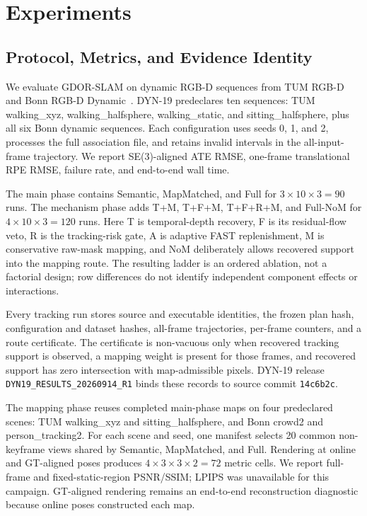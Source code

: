 \section{Experiments}
\label{sec:experiments}

\subsection{Protocol, Metrics, and Evidence Identity}

We evaluate GDOR-SLAM on dynamic RGB-D sequences from TUM RGB-D~\cite{sturm2012benchmark} and Bonn RGB-D Dynamic~\cite{palazzolo2019bonn}.
DYN-19 predeclares ten sequences: TUM walking\_xyz, walking\_halfsphere, walking\_static, and sitting\_halfsphere, plus all six Bonn dynamic sequences.
Each configuration uses seeds 0, 1, and 2, processes the full association file, and retains invalid intervals in the all-input-frame trajectory.
We report SE(3)-aligned ATE RMSE, one-frame translational RPE RMSE, failure rate, and end-to-end wall time.

The main phase contains Semantic, MapMatched, and Full for $3\times10\times3=90$ runs.
The mechanism phase adds T+M, T+F+M, T+F+R+M, and Full-NoM for $4\times10\times3=120$ runs.
Here T is temporal-depth recovery, F is its residual-flow veto, R is the tracking-risk gate, A is adaptive FAST replenishment, M is conservative raw-mask mapping, and NoM deliberately allows recovered support into the mapping route.
The resulting ladder is an ordered ablation, not a factorial design; row differences do not identify independent component effects or interactions.

Every tracking run stores source and executable identities, the frozen plan hash, configuration and dataset hashes, all-frame trajectories, per-frame counters, and a route certificate.
The certificate is non-vacuous only when recovered tracking support is observed, a mapping weight is present for those frames, and recovered support has zero intersection with map-admissible pixels.
DYN-19 release \texttt{DYN19\_RESULTS\_20260914\_R1} binds these records to source commit \texttt{14c6b2c}.

The mapping phase reuses completed main-phase maps on four predeclared scenes: TUM walking\_xyz and sitting\_halfsphere, and Bonn crowd2 and person\_tracking2.
For each scene and seed, one manifest selects 20 common non-keyframe views shared by Semantic, MapMatched, and Full.
Rendering at online and GT-aligned poses produces $4\times3\times3\times2=72$ metric cells.
We report full-frame and fixed-static-region PSNR/SSIM; LPIPS was unavailable for this campaign.
GT-aligned rendering remains an end-to-end reconstruction diagnostic because online poses constructed each map.

